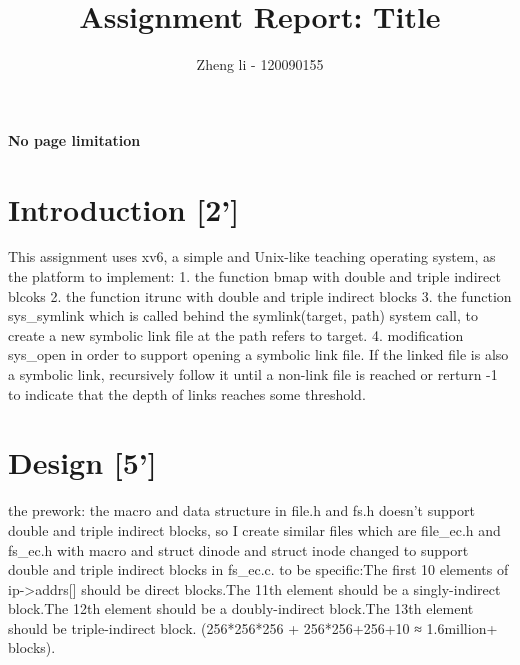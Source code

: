 \documentclass{article}
\title{Assignment Report: Title}
\author{Zheng li - 120090155}
\begin{document}
\maketitle



\textbf{No page limitation}

\section{Introduction [2']}

This assignment uses xv6, a simple and Unix-like teaching operating system, as the platform to implement: 
1. the function  bmap with double and triple indirect blcoks 
2. the function  itrunc with double and triple indirect blocks
3. the function  sys_symlink which is called behind the symlink(target, path) system call, to create a new symbolic link file at the path refers to target.
4. modification  sys_open in order to support opening a symbolic link file. If the linked file is also a symbolic link, recursively follow it until a non-link file is
reached or rerturn -1 to indicate that the depth of links reaches some threshold.

\section{Design [5']}

the prework: the macro and data structure in file.h and fs.h doesn't support double and triple indirect blocks, 
so I create similar files which are file_ec.h and fs_ec.h with macro and struct dinode and struct inode changed to support double and triple indirect blocks in fs_ec.c.
to be specific:The first 10 elements of ip->addrs[] should be direct blocks.The 11th element should be a singly-indirect block.The 12th element should be a doubly-indirect block.The 13th element should be triple-indirect block. 
(256*256*256 + 256*256+256+10 ≈ 1.6million+ blocks).
\end{document}
